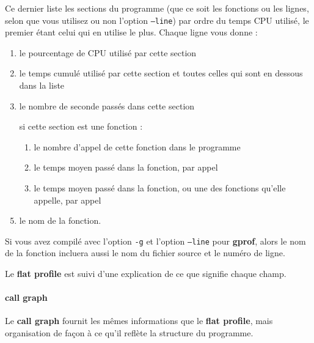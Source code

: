 \documentclass[a4paper,twoside]{article}
\begin{document}
Ce dernier liste les sections du programme (que ce soit les fonctions ou les lignes, selon que vous utilisez ou non l'option \texttt{--line}) par ordre du temps CPU utilisé, le premier étant celui qui en utilise le plus. Chaque ligne vous donne : 
\begin{enumerate}
\item le pourcentage de CPU utilisé par cette section
\item le temps cumulé utilisé par cette section et toutes celles qui sont en dessous dans la liste
\item le nombre de seconde passés dans cette section
\item [si cette section est une fonction] : 
\begin{enumerate}
\item le nombre d'appel de cette fonction dans le programme
\item le temps moyen passé dans la fonction, par appel
\item le temps moyen passé dans la fonction, ou une des fonctions qu'elle appelle, par appel
\end{enumerate}
\item le nom de la fonction.
\end{enumerate}

\begin{remarque}
Si vous avez compilé avec l'option \texttt{-g} et l'option \texttt{--line} pour \textbf{gprof}, alors le nom de la fonction incluera aussi le nom du fichier source et le numéro de ligne. 

Le \textbf{flat profile} est suivi d'une explication de ce que signifie chaque champ.
\end{remarque}

\paragraph{call graph}
Le \textbf{call graph} fournit les mêmes informations que le \textbf{flat profile}, mais organisation de façon à ce qu'il reflète la structure du programme. 
\end{document}
